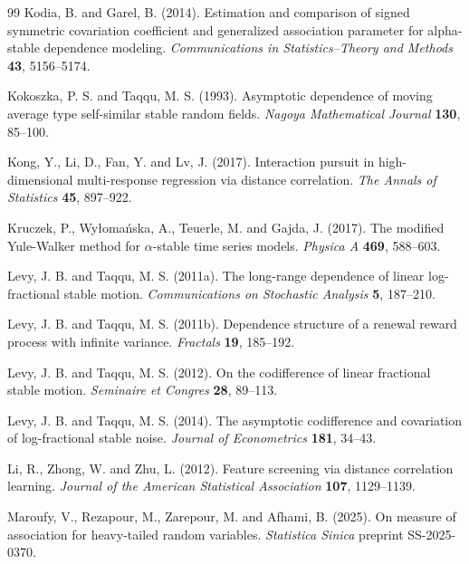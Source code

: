 \documentclass[11pt]{article}
\theoremstyle{definition}
\begin{document}
\begin{thebibliography}{99}
Kodia, B. and Garel, B. (2014). Estimation and comparison of signed symmetric covariation coefficient and generalized association parameter for alpha-stable dependence modeling. \emph{Communications in Statistics--Theory and Methods} \textbf{43}, 5156--5174.

Kokoszka, P. S. and Taqqu, M. S. (1993). Asymptotic dependence of moving average type self-similar stable random fields. \emph{Nagoya Mathematical Journal} \textbf{130}, 85--100.

Kong, Y., Li, D., Fan, Y. and Lv, J. (2017). Interaction pursuit in high-dimensional multi-response regression via distance correlation. \emph{The Annals of Statistics} \textbf{45}, 897--922.

Kruczek, P., Wy\l oma\'nska, A., Teuerle, M. and Gajda, J. (2017). The modified Yule-Walker method for \(\alpha\)-stable time series models. \emph{Physica A} \textbf{469}, 588--603.

Levy, J. B. and Taqqu, M. S. (2011a). The long-range dependence of linear log-fractional stable motion. \emph{Communications on Stochastic Analysis} \textbf{5}, 187--210.

Levy, J. B. and Taqqu, M. S. (2011b). Dependence structure of a renewal reward process with infinite variance. \emph{Fractals} \textbf{19}, 185--192.

Levy, J. B. and Taqqu, M. S. (2012). On the codifference of linear fractional stable motion. \emph{Seminaire et Congres} \textbf{28}, 89--113.

Levy, J. B. and Taqqu, M. S. (2014). The asymptotic codifference and covariation of log-fractional stable noise. \emph{Journal of Econometrics} \textbf{181}, 34--43.

Li, R., Zhong, W. and Zhu, L. (2012). Feature screening via distance correlation learning. \emph{Journal of the American Statistical Association} \textbf{107}, 1129--1139.

Maroufy, V., Rezapour, M., Zarepour, M. and Afhami, B. (2025). On measure of association for heavy-tailed random variables. \emph{Statistica Sinica} preprint SS-2025-0370.


\end{thebibliography}
\end{document}
